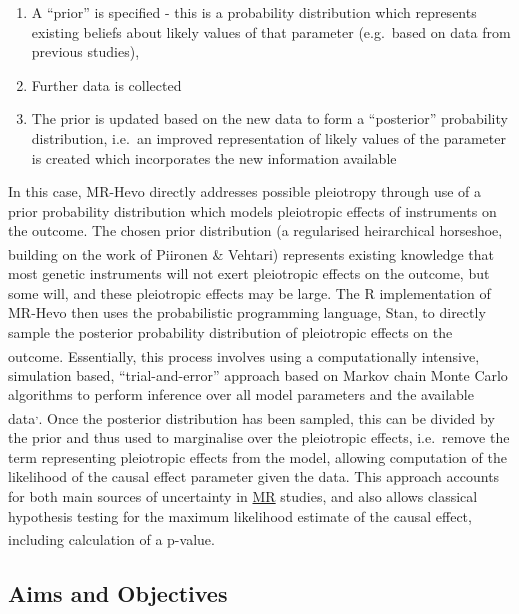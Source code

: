 \documentclass[
]{article}
\providecommand{\tightlist}{%
  \setlength{\itemsep}{0pt}\setlength{\parskip}{0pt}}
\begin{document}
\begin{enumerate}
\def\labelenumi{\arabic{enumi}.}
\tightlist
\item
  A ``prior'' is specified - this is a probability distribution which represents existing beliefs about likely values of that parameter (e.g.~based on data from previous studies),
\item
  Further data is collected
\item
  The prior is updated based on the new data to form a ``posterior'' probability distribution, i.e.~an improved representation of likely values of the parameter is created which incorporates the new information available
\end{enumerate}

In this case, MR-Hevo directly addresses possible pleiotropy through use of a prior probability distribution which models pleiotropic effects of instruments on the outcome. The chosen prior distribution (a regularised heirarchical horseshoe, building on the work of Piironen \& Vehtari\textsuperscript{}) represents existing knowledge that most genetic instruments will not exert pleiotropic effects on the outcome, but some will, and these pleiotropic effects may be large. The R implementation of MR-Hevo then uses the probabilistic programming language, Stan, to directly sample the posterior probability distribution of pleiotropic effects on the outcome\textsuperscript{}. Essentially, this process involves using a computationally intensive, simulation based, ``trial-and-error'' approach based on Markov chain Monte Carlo algorithms to perform inference over all model parameters and the available data\textsuperscript{,}. Once the posterior distribution has been sampled, this can be divided by the prior and thus used to marginalise over the pleiotropic effects, i.e.~remove the term representing pleiotropic effects from the model, allowing computation of the likelihood of the causal effect parameter given the data. This approach accounts for both main sources of uncertainty in \hyperref[acronyms_MR]{MR} studies, and also allows classical hypothesis testing for the maximum likelihood estimate of the causal effect, including calculation of a p-value\textsuperscript{}.

\subsection{Aims and Objectives}\label{aims-and-objectives}
\end{document}
